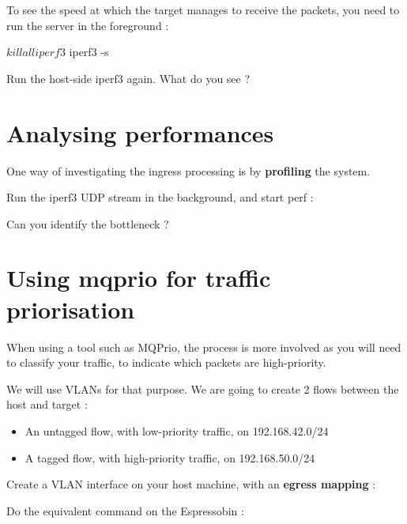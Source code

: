 To see the speed at which the target manages to receive the packets, you need to
run the  server in the foreground :

\begin{targetbashinput}
$ killall iperf3
$ iperf3 -s
\end{targetbashinput}

Run the host-side iperf3 again. What do you see ?

\section{Analysing performances}

One way of investigating the ingress processing is by \textbf{profiling} the system.

Run the iperf3 UDP stream in the background, and start perf :


Can you identify the bottleneck ?

\section{Using mqprio for traffic priorisation}

When using a tool such as MQPrio, the process is more involved as you will need
to classify your traffic, to indicate which packets are high-priority.

We will use VLANs for that purpose. We are going to create 2 flows between the
host and target :
\begin{itemize}
	\item An untagged flow, with low-priority traffic, on 192.168.42.0/24
	\item A tagged flow, with high-priority traffic, on 192.168.50.0/24
\end{itemize}

Create a VLAN interface on your host machine, with an \textbf{egress mapping} :


Do the equivalent command on the Espressobin :

